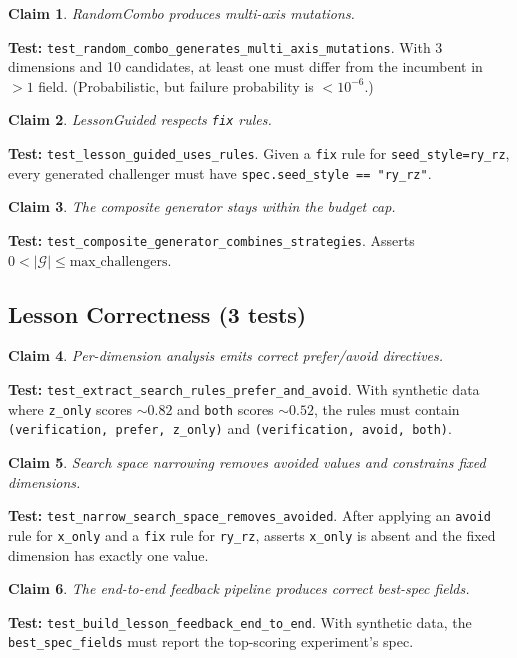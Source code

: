 \documentclass[11pt,a4paper]{article}
\newtheorem{claim}{Claim}[section]
\newcommand{\code}[1]{\texttt{#1}}
\begin{document}
\begin{claim}
\label{claim:multiaxis}
RandomCombo produces multi-axis mutations.
\end{claim}
\textbf{Test:} \code{test\_random\_combo\_generates\_multi\_axis\_mutations}.
With 3 dimensions and 10 candidates, at least one must differ from the
incumbent in $>1$ field. (Probabilistic, but failure probability is
$< 10^{-6}$.)

\begin{claim}
\label{claim:guided}
LessonGuided respects \code{fix} rules.
\end{claim}
\textbf{Test:} \code{test\_lesson\_guided\_uses\_rules}. Given a \code{fix}
rule for \code{seed\_style=ry\_rz}, every generated challenger must have
\code{spec.seed\_style == "ry\_rz"}.

\begin{claim}
\label{claim:composite}
The composite generator stays within the budget cap.
\end{claim}
\textbf{Test:} \code{test\_composite\_generator\_combines\_strategies}.
Asserts $0 < |\mathcal{G}| \leq \text{max\_challengers}$.

\subsection{Lesson Correctness (3 tests)}

\begin{claim}
\label{claim:rules}
Per-dimension analysis emits correct prefer/avoid directives.
\end{claim}
\textbf{Test:} \code{test\_extract\_search\_rules\_prefer\_and\_avoid}. With
synthetic data where \code{z\_only} scores $\sim\!0.82$ and \code{both}
scores $\sim\!0.52$, the rules must contain \code{(verification, prefer,
z\_only)} and \code{(verification, avoid, both)}.

\begin{claim}
\label{claim:narrow}
Search space narrowing removes avoided values and constrains fixed dimensions.
\end{claim}
\textbf{Test:} \code{test\_narrow\_search\_space\_removes\_avoided}. After
applying an \code{avoid} rule for \code{x\_only} and a \code{fix} rule for
\code{ry\_rz}, asserts \code{x\_only} is absent and the fixed dimension has
exactly one value.

\begin{claim}
\label{claim:feedback}
The end-to-end feedback pipeline produces correct best-spec fields.
\end{claim}
\textbf{Test:} \code{test\_build\_lesson\_feedback\_end\_to\_end}. With
synthetic data, the \code{best\_spec\_fields} must report the top-scoring
experiment's spec.
\end{document}
